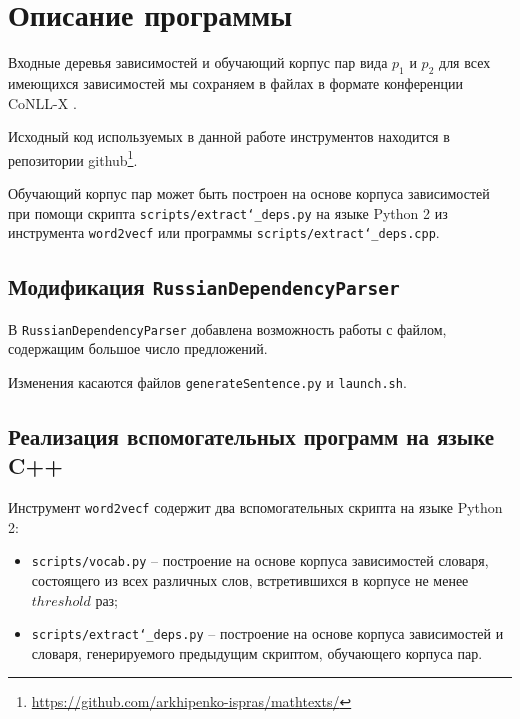 \documentclass[oneside,senior,etd]{BYUPhys}
\begin{document}
\section{Описание программы}
\label{sec:Chapter4} 

Входные деревья зависимостей и обучающий корпус пар вида \(p_1\) и \(p_2\) для всех имеющихся зависимостей мы сохраняем в файлах в формате конференции CoNLL-X \cite{format}.

Исходный код используемых в данной работе инструментов находится в репозитории github\footnote{\url{https://github.com/arkhipenko-ispras/mathtexts/}}.

Обучающий корпус пар может быть построен на основе корпуса зависимостей при помощи скрипта \texttt{scripts/extract\char`_deps.py} на языке Python 2 из инструмента \texttt{word2vecf} или программы \texttt{scripts/extract\char`_deps.cpp}.

\subsection{Модификация \texttt{RussianDependencyParser}}

В \texttt{RussianDependencyParser} добавлена возможность работы с файлом, содержащим большое число предложений.

Изменения касаются файлов \texttt{generateSentence.py} и \texttt{launch.sh}.

\subsection{Реализация вспомогательных программ на языке C++}

Инструмент \texttt{word2vecf} содержит два вспомогательных скрипта на языке Python 2:
\begin{itemize}
        \item
        \texttt{scripts/vocab.py} -- построение на основе корпуса зависимостей словаря, состоящего из всех различных слов, встретившихся в корпусе не менее \(threshold\) раз;
        \item
        \texttt{scripts/extract\char`_deps.py} -- построение на основе корпуса зависимостей и словаря, генерируемого предыдущим скриптом, обучающего корпуса пар.
\end{itemize}
\end{document}
